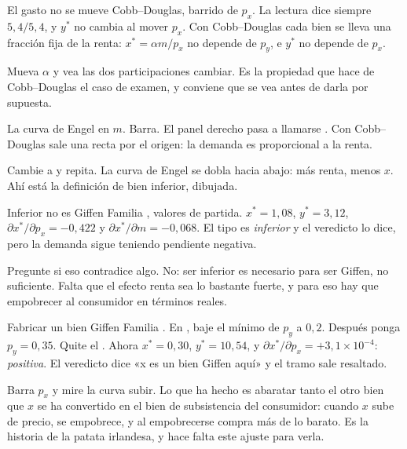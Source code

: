 \documentclass[11pt,a4paper]{appletmanual}
\begin{document}
\begin{activity}{El gasto no se mueve}
\amset Cobb--Douglas, barrido de $p_x$.
\amexp La lectura  dice siempre $5{,}4 / 5{,}4$, y $y^\ast$ no cambia
al mover $p_x$. Con Cobb--Douglas cada bien se lleva una fracción fija de la
renta: $x^\ast = \alpha m / p_x$ no depende de $p_y$, e $y^\ast$ no depende de
$p_x$.
\par\smallskip
Mueva $\alpha$ y vea las dos participaciones cambiar. Es la propiedad que hace
de Cobb--Douglas el caso de examen, y conviene que se vea antes de darla por
supuesta.
\end{activity}

\begin{activity}{La curva de Engel}
\amset {} en $m$. Barra.
\amexp El panel derecho pasa a llamarse . Con
Cobb--Douglas sale una recta por el origen: la demanda es proporcional a la
renta.
\par\smallskip
Cambie a  y repita. La curva de Engel se dobla hacia abajo:
más renta, menos $x$. Ahí está la definición de bien inferior, dibujada.
\end{activity}

\begin{activity}{Inferior no es Giffen}
\amset Familia , valores de partida.
\amexp $x^\ast = 1{,}08$, $y^\ast = 3{,}12$,
$\partial x^\ast/\partial p_x = -0{,}422$ y
$\partial x^\ast/\partial m = -0{,}068$. El tipo es \emph{inferior} y el
veredicto lo dice, pero la demanda sigue teniendo pendiente negativa.
\par\smallskip
Pregunte si eso contradice algo. No: ser inferior es necesario para ser Giffen,
no suficiente. Falta que el efecto renta sea lo bastante fuerte, y para eso hay
que empobrecer al consumidor en términos reales.
\end{activity}

\begin{activity}{Fabricar un bien Giffen}
\amset Familia . En , baje el mínimo de $p_y$ a
$0{,}2$. Después ponga $p_y = 0{,}35$. Quite el .
\amexp Ahora $x^\ast = 0{,}30$, $y^\ast = 10{,}54$, y
$\partial x^\ast/\partial p_x = +3{,}1\times 10^{-4}$: \emph{positiva}. El
veredicto dice «x es un bien Giffen aquí» y el tramo sale resaltado.
\par\smallskip
Barra $p_x$ y mire la curva subir. Lo que ha hecho es abaratar tanto el otro
bien que $x$ se ha convertido en el bien de subsistencia del consumidor: cuando
$x$ sube de precio, se empobrece, y al empobrecerse compra más de lo barato.
Es la historia de la patata irlandesa, y hace falta este ajuste para verla.
\end{activity}
\end{document}
